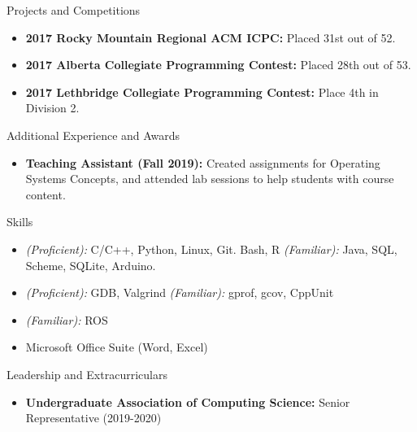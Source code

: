 \documentclass[]{mcdowellcv}
\begin{document}
\vspace*{-10pt}

\begin{cvsection}{Projects and Competitions}
  \begin{cvsubsection}{}{}{}
    \begin{itemize}
      \item \textbf{2017 Rocky Mountain Regional ACM ICPC:} Placed 31st out of 52.
      \item \textbf{2017 Alberta Collegiate Programming Contest:} Placed 28th out of 53.
      \item \textbf{2017 Lethbridge Collegiate Programming Contest:} Place 4th in Division 2.
    \end{itemize}
  \end{cvsubsection}
\end{cvsection}

\vspace*{-10pt}

\begin{cvsection}{Additional Experience and Awards}
  \begin{cvsubsection}{}{}{}	
    \begin{itemize}
      \item \textbf{Teaching Assistant (Fall 2019):} Created assignments for Operating Systems Concepts, and attended lab sessions to help students with course content.
    \end{itemize}
  \end{cvsubsection}
\end{cvsection}

\vspace*{-10pt}

\begin{cvsection}{Skills}
  \begin{cvsubsection}{}{}{}	
    \begin{itemize}
      \item \emph{(Proficient):} C/C++, Python, Linux, Git. Bash, R  
            \emph{(Familiar):} Java, SQL, Scheme, SQLite, Arduino.
      \item \emph{(Proficient):} GDB, Valgrind
            \emph{(Familiar):} gprof, gcov, CppUnit
          \item \emph{(Familiar):} ROS      
      \item Microsoft Office Suite (Word, Excel)
    \end{itemize}
  \end{cvsubsection}
\end{cvsection}

\vspace*{-10pt}

\begin{cvsection}{Leadership and Extracurriculars}{}{}
  \begin{cvsubsection}
    {}{}{}
    \begin{itemize}
      \item \textbf{Undergraduate Association of Computing Science:} Senior Representative (2019-2020)  
    \end{itemize}
  \end{cvsubsection}
\end{cvsection}
\end{document}
